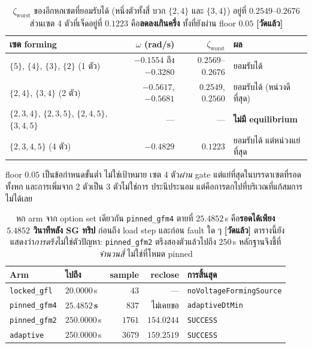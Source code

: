 \documentclass[11pt,a4paper]{article}
\newcommand{\code}[1]{\texttt{\small #1}}
\newcommand{\zworst}{\zeta_{\mathrm{worst}}}
\newcommand{\mes}{\textcolor{ok}{\textbf{[วัดแล้ว]}}}
\begin{document}
\begin{table}[H]
\centering\small
\begin{tabular}{@{}lrrl@{}}
\toprule
\textbf{เซต forming} & $\omega$ (rad/s) & $\zworst$ & \textbf{ผล}\\
\midrule
$\{5\}$, $\{4\}$, $\{3\}$, $\{2\}$ (1 ตัว) & $-0.1554$ ถึง $-0.3280$ & $0.2569$--$0.2676$ & ยอมรับได้\\
$\{2,4\}$, $\{3,4\}$ (2 ตัว) & $-0.5617$, $\mathbf{-0.5681}$ & $0.2549$, $0.2560$ & ยอมรับได้ (หน่วงดีที่สุด)\\
$\{2,3,4\}$, $\{2,3,5\}$, $\{2,4,5\}$, $\{3,4,5\}$ & --- & --- & \textcolor{no}{\textbf{ไม่มี equilibrium}}\\
$\{2,3,4,5\}$ (4 ตัว) & $-0.4829$ & \textcolor{no}{$\mathbf{0.1223}$} & ยอมรับได้ แต่หน่วงแย่ที่สุด\\
\bottomrule
\end{tabular}
\caption{$\zworst$ ของอีกหกเซตที่ยอมรับได้ (หนึ่งตัวทั้งสี่ บวก $\{2,4\}$
และ $\{3,4\}$) อยู่ที่ $0.2549$--$0.2676$ ส่วนเซต 4 ตัวที่เจ็ดอยู่ที่
$\mathbf{0.1223}$ คือ\textbf{ลดลงเกินครึ่ง} ทั้งที่ยังผ่าน floor $0.05$ \mes}
\end{table}

\noindent
floor $0.05$ เป็นข้อกำหนดขั้นต่ำ ไม่ใช่เป้าหมาย เซต 4 ตัว\emph{ผ่าน} gate
แต่แย่ที่สุดในบรรดาเซตที่รอดทั้งหก และการเพิ่มจาก 2 ตัวเป็น 3 ตัวไม่ใช่การ
ประนีประนอม แต่คือการตกไปที่บริเวณที่แก้สมการไม่ได้เลย

\begin{table}[H]
\centering\small
\begin{tabular}{@{}llrrl@{}}
\toprule
\textbf{Arm} & \textbf{ไปถึง} & \textbf{sample} & \textbf{reclose} & \textbf{การสิ้นสุด}\\
\midrule
\code{locked\_gfl}  & $20.0000$\,s & $43$   & ---        & \code{noVoltageFormingSource}\\
\code{pinned\_gfm4} & \textcolor{no}{$\mathbf{25.4852}$\,\textbf{s}} & $837$ & ไม่เคยขอ & \code{adaptiveDtMin}\\
\code{pinned\_gfm2} & $250.0000$\,s & $1761$ & $154.0244$ & \code{SUCCESS}\\
\code{adaptive}     & $250.0000$\,s & $3679$ & $159.2519$ & \code{SUCCESS}\\
\bottomrule
\end{tabular}
\caption{หก arm จาก option set เดียวกัน \code{pinned\_gfm4} ตายที่ $25.4852$\,s
คือ\textbf{รอดได้เพียง $5.4852$ วินาทีหลัง SG ทริป} ก่อนถึง load step และก่อน
fault ใด ๆ \mes{} ตารางนี้ยังแสดงว่า\emph{การตรึง}ไม่ใช่ตัวปัญหา:
\code{pinned\_gfm2} ตรึงสองตัวแล้วไปถึง $250$\,s หลักฐานจึงชี้ที่\emph{จำนวนสี่}
ไม่ใช่ที่โหมด pinned}
\end{table}
\end{document}
